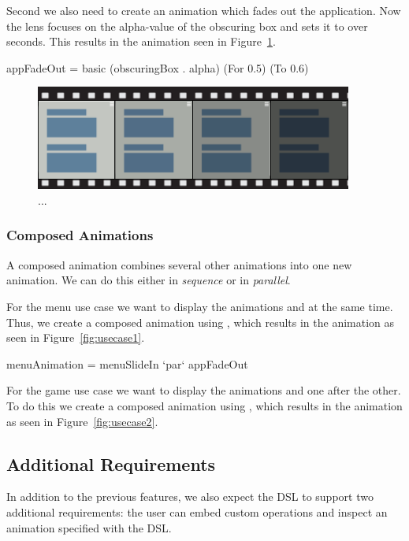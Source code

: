 Second we also need to create an animation which fades out the application. Now the lens focuses on the alpha-value of the obscuring box and sets it to  over  seconds. This results in the animation seen in Figure~\ref{fig:usecase1basic2}.

\begin{code}
appFadeOut = basic (obscuringBox . alpha) (For 0.5) (To 0.6)
\end{code}

\begin{figure}[H]
\centering
\includegraphics[scale=0.4]{pictures/usecase1basic2.png}
\caption{...}
\label{fig:usecase1basic2}
\end{figure}

\subsubsection{Composed Animations}

A composed animation combines several other animations into one new animation. We can do this either in \emph{sequence} or in \emph{parallel}.

For the menu use case we want to display the animations  and  at the same time. Thus, we create a composed animation using ,  which results in the animation as seen in Figure~\ref{fig:usecase1}.

\begin{code}
menuAnimation = menuSlideIn `par` appFadeOut
\end{code}

For the game use case we want to display the animations  and  one after the other. To do this we create a composed animation using , which results in the animation as seen in Figure~\ref{fig:usecase2}.

\subsection{Additional Requirements}

In addition to the previous features, we also expect the DSL to support two additional requirements: the user can embed custom operations and inspect an animation specified with the DSL.

